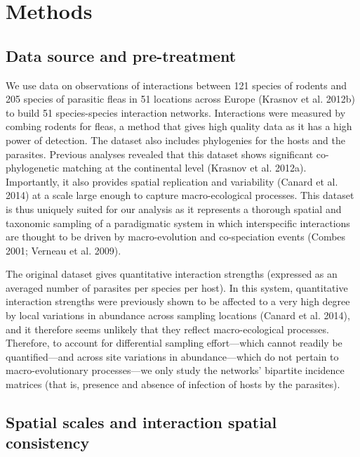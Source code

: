 \documentclass[11pt,serif]{article}
\begin{document}
\section{Methods}\label{methods}

\subsection{Data source and
pre-treatment}\label{data-source-and-pre-treatment}

We use data on observations of interactions between 121 species of
rodents and 205 species of parasitic fleas in 51 locations across Europe
(Krasnov et al. 2012b) to build 51 species-species interaction networks.
Interactions were measured by combing rodents for fleas, a method that
gives high quality data as it has a high power of detection. The dataset
also includes phylogenies for the hosts and the parasites. Previous
analyses revealed that this dataset shows significant co-phylogenetic
matching at the continental level (Krasnov et al. 2012a). Importantly,
it also provides spatial replication and variability (Canard et al.
2014) at a scale large enough to capture macro-ecological processes.
This dataset is thus uniquely suited for our analysis as it represents a
thorough spatial and taxonomic sampling of a paradigmatic system in
which interspecific interactions are thought to be driven by
macro-evolution and co-speciation events (Combes 2001; Verneau et al.
2009).

The original dataset gives quantitative interaction strengths (expressed
as an averaged number of parasites per species per host). In this
system, quantitative interaction strengths were previously shown to be
affected to a very high degree by local variations in abundance across
sampling locations (Canard et al. 2014), and it therefore seems unlikely
that they reflect macro-ecological processes. Therefore, to account for
differential sampling effort---which cannot readily be quantified---and
across site variations in abundance---which do not pertain to
macro-evolutionary processes---we only study the networks' bipartite
incidence matrices (that is, presence and absence of infection of hosts
by the parasites).

\subsection{Spatial scales and interaction spatial
consistency}\label{spatial-scales-and-interaction-spatial-consistency}
\end{document}
